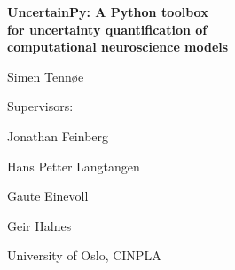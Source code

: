 \documentclass[presentation]{beamer}
\begin{document}
\begin{frame}
    \textbf{\color{myred}\Large UncertainPy: A Python toolbox \\
    \vspace{1mm} for uncertainty quantification of \\
    \vspace{2mm} computational neuroscience models}


     \large \vspace{8mm} Simen Tennøe

      \vspace{6mm}
      \footnotesize Supervisors:

      \vspace{1mm}
      Jonathan Feinberg

      Hans Petter Langtangen

      Gaute Einevoll

      Geir Halnes

      \vspace{5mm}
    \small University of Oslo, CINPLA


\end{frame}
\end{document}

